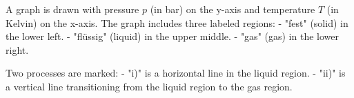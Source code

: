 A graph is drawn with pressure \( p \) (in bar) on the y-axis and temperature \( T \) (in Kelvin) on the x-axis. The graph includes three labeled regions:  
- "fest" (solid) in the lower left.  
- "flüssig" (liquid) in the upper middle.  
- "gas" (gas) in the lower right.  

Two processes are marked:  
- "i)" is a horizontal line in the liquid region.  
- "ii)" is a vertical line transitioning from the liquid region to the gas region.